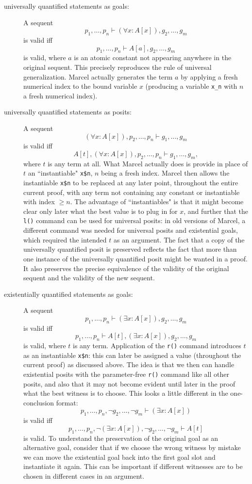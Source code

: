 \documentclass[12pt]{book}
\begin{document}
\begin{description}

\item[universally quantified statements as goals:]

A sequent $$p_1,\ldots,p_n \vdash (\forall x:A[x]),g_2,\ldots,g_m$$ is valid iff $$p_1,\ldots,p_n \vdash A[a],g_2,\ldots,g_m$$ is valid, where $a$ is an atomic constant not appearing anywhere in the original sequent.  This precisely reproduces the rule of universal generalization.  Marcel actually generates the term $a$ by applying a fresh numerical index to the bound variable $x$ (producing a variable {\tt x\_n} with $n$ a fresh numerical index).

\item[universally quantified statements as posits:]

A sequent $$(\forall x:A[x]),p_2,\ldots,p_n \vdash g_1,\ldots,g_m$$ is valid iff $$A[t],(\forall x:A[x]),p_2,\ldots,p_n \vdash g_1,\ldots,g_m,$$ where $t$ is any term at all.
What Marcel actually does is provide in place of $t$ an ``instantiable" {\tt x\$n}, $n$ being a fresh index.  Marcel then allows the instantiable {\tt x\$n} to be replaced at any later point, throughout the entire current proof, with any term not containing any constant or instantiable with index $\geq n$.  The advantage of ``instantiables" is that it might become clear only later what the best value is to plug in for $x$, and further that the {\tt l()} command can be used for universal posits:  in old versions of Marcel, a different command was needed for universal posits and existential goals, which required the intended $t$ as an argument.  The fact that a copy of the universally quantified posit is preserved reflects the fact that more than one instance of the universally quantified posit might be wanted in a proof.  It also preserves the precise equivalence of the validity of the original sequent and the validity of the new sequent.

\item[existentially quantified statements as goals:]

A sequent  $$p_1,\ldots,p_n \vdash (\exists x:A[x]),g_2,\ldots,g_m$$ is valid iff $$p_1,\ldots,p_n \vdash A[t],(\exists x:A[x]),g_2,\ldots,g_m$$ is valid, where $t$ is any term.
Application of the {\tt r()} command introduces $t$ as an instantiable {\tt x\$n}:  this can later be assigned a value (throughout the current proof) as discussed above.  The idea is that we then can handle existential posits with the parameter-free {\tt r()} command like all other posits, and also that it may not become evident until later in the proof what the best witness is to choose.  This looks a little different in the one-conclusion format:  $$p_1,\ldots,p_n,\neg g_2,\ldots,\neg g_m \vdash (\exists x:A[x])$$ is valid iff $$p_1,\ldots,p_n,\neg(\exists x:A[x]),\neg g_2,\ldots,\neg g_m \vdash A[t]$$ is valid.  To understand the preservation of the original goal as an alternative goal, consider that if we choose the wrong witness by mistake we can move the existential goal back into the first goal slot and instantiate it again.  This can be important if different witnesses are to be chosen in different cases in an argument.


\end{description}
\end{document}
